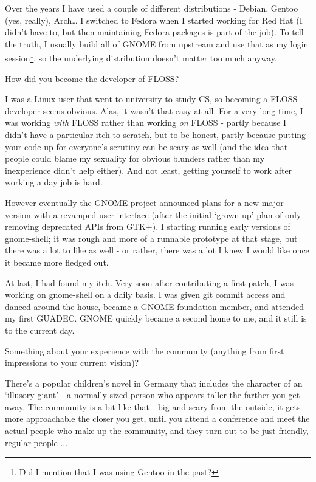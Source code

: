 \documentclass[10pt, a5paper]{article}
\begin{document}
\begin{Parallel}[p]{}{}
{Over the years I have used a couple of different distributions - Debian, Gentoo (yes, really), Arch… I switched to Fedora when I started working for Red Hat (I didn't have to, but then maintaining Fedora packages is part of the job). To tell the truth, I usually build all of GNOME from upstream and use that as my login session\footnote{Did I mention that I was using Gentoo in the past?}, so the underlying distribution doesn't matter too much anyway.




\q How did you become the developer of FLOSS?

\a I was a Linux user that went to university to study CS, so becoming a FLOSS developer seems obvious. Alas, it wasn't that easy at all. For a very long time, I was working \emph{with} FLOSS rather than working \emph{on} FLOSS - partly because I didn't have a particular itch to scratch, but to be honest, partly because putting your code up for everyone's scrutiny can be scary as well (and the idea that people could blame my sexuality for obvious blunders rather than my inexperience didn't help either). And not least, getting yourself to work after working a day job is hard.

However eventually the GNOME project announced plans for a new major version with a revamped user interface (after the initial ‘grown-up’ plan of only removing deprecated APIs from GTK+). I starting running early versions of gnome-shell; it was rough and more of a runnable prototype at that stage, but there was a lot to like as well - or rather, there was a lot I knew I would like once it became more fledged out.

At last, I had found my itch. Very soon after contributing a first patch, I was working on gnome-shell on a daily basis. I was given git commit access and danced around the house, became a GNOME foundation member, and attended my first GUADEC. GNOME quickly became a second home to me, and it still is to the current day.


\q Something about your experience with the community (anything from first
impressions to your current vision)?

\a There's a popular children's novel in Germany that includes the character of an ‘illusory giant’ - a normally sized person who appears taller the farther you get away. The community is a bit like that - big and scary from the outside, it gets more approachable the closer you get, until you attend a conference and meet the actual people who make up the community, and they turn out to be just friendly, regular people ...

}
\end{Parallel}
\end{document}

